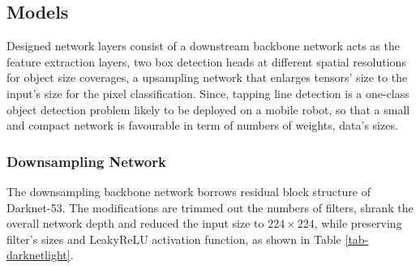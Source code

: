 \documentclass[default,pdflatex,iicol]{sn-jnl}%
\begin{document}
\subsection{Models}\label{subsec-model}
Designed network layers consist of a downstream backbone network acts as the feature extraction layers, two box detection heads at different spatial resolutions for object size coverages, a upsampling network that enlarges tensors' size to the input's size for the pixel classification. Since, tapping line detection is a one-class object detection problem likely to be deployed on a mobile robot, so that a small and compact network is favourable \textemdash in term of numbers of weights, data's sizes.

\subsubsection{Downsampling Network}
The downsampling backbone network borrows residual block structure of Darknet-53. The modifications are trimmed out the numbers of filters, shrank the overall network depth and reduced the input size to $224 \times 224$, while preserving filter's sizes and LeakyReLU activation function, as shown in Table \ref{tab-darknetlight}.
\end{document}
